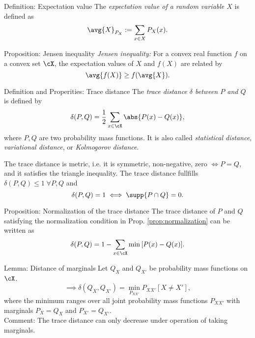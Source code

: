 \documentclass[
			print,
			a6paper,
			grid=none]{kartei}
\begin{document}
\begin{karte}{Definition: Expectation value}
	The \emph{expectation value of a random variable $X$} is defined as
	\begin{equation*}
		\avg{X}_{P_X}:=\sum_{x\in X} P_X(x).
	\end{equation*}
\end{karte}

\begin{karte}{Proposition: Jensen inequality}
	\emph{Jensen inequality:} For a convex real function $f$ on a convex set $\cX$, the expectation values of $X$ and $f(X)$ are related by
	\begin{equation*}
		\avg{f(X)}\geq f(\avg{X}).
	\end{equation*}
\end{karte}

\begin{karte}{Definition and Properities: Trace distance}
	The \emph{trace distance $\delta$ between $P$ and $Q$} is defined by
	\begin{equation*}
		\delta(P,Q) = \frac{1}{2}\sum_{x\in\cX} \abs{P(x) - Q(x)},
	\end{equation*}
	where $P,Q$ are two probability mass functions. It is also called \emph{statistical distance}, \emph{variational distance}, or \emph{Kolmogorov distance}.

	The trace distance is metric, i.e. it is symmetric, non-negative, zero $\iff P=Q$, and it satisfies the triangle inequality. The trace distance fullfills $\delta(P,Q)\leq 1 \;\forall P,Q$ and 
	\begin{equation*}
		\delta(P,Q)=1 \iff \supp{P\cap Q}=0.
	\end{equation*}
\end{karte}

\begin{karte}{Proposition: Normalization of the trace distance}
	The trace distance of $P$ and $Q$ satisfying the normalization condition in Prop. \ref{prop:normalization} can be written as
	\begin{equation*}
		\delta(P,Q) = 1-\sum_{x\in\cX} \min{[P(x) - Q(x)]}.
	\end{equation*}
\end{karte}

\begin{karte}{Lemma: Distance of marginals}
	Let $Q_X$ and $Q_{X'}$ be probability mass functions on $\cX$. 
	\begin{equation*}
		\implies \delta(Q_X,Q_{X'}) = \min_{P_{XX'}} P_{XX'}[X\neq X'],
	\end{equation*}
	where the minimum ranges over all joint probability mass functions $P_{XX'}$ with marginals $P_X=Q_X$ and $P_{X'}=Q_{X'}$.\\
	Comment: The trace distance can only decrease under operation of taking marginals.
\end{karte}
\end{document}
